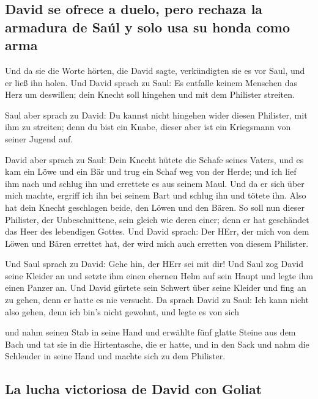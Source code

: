 \hypertarget{david-se-ofrece-a-duelo-pero-rechaza-la-armadura-de-sauxfal-y-solo-usa-su-honda-como-arma}{%
\subsection{David se ofrece a duelo, pero rechaza la armadura de Saúl y
solo usa su honda como
arma}\label{david-se-ofrece-a-duelo-pero-rechaza-la-armadura-de-sauxfal-y-solo-usa-su-honda-como-arma}}

 Und da sie die Worte hörten, die David sagte,
verkündigten sie es vor Saul, und er ließ ihn holen.  Und
David sprach zu Saul: Es entfalle keinem Menschen das Herz um deswillen;
dein Knecht soll hingehen und mit dem Philister streiten.

 Saul aber sprach zu David: Du kannst nicht hingehen
wider diesen Philister, mit ihm zu streiten; denn du bist ein Knabe,
dieser aber ist ein Kriegsmann von seiner Jugend auf.

 David aber sprach zu Saul: Dein Knecht hütete die Schafe
seines Vaters, und es kam ein Löwe und ein Bär und trug ein Schaf weg
von der Herde;  und ich lief ihm nach und schlug ihn und
errettete es aus seinem Maul. Und da er sich über mich machte, ergriff
ich ihn bei seinem Bart und schlug ihn und tötete ihn. 
Also hat dein Knecht geschlagen beide, den Löwen und den Bären. So soll
nun dieser Philister, der Unbeschnittene, sein gleich wie deren einer;
denn er hat geschändet das Heer des lebendigen Gottes. 
Und David sprach: Der HErr, der mich von dem Löwen und Bären errettet
hat, der wird mich auch erretten von diesem Philister.

 Und Saul sprach zu David: Gehe hin, der HErr sei mit
dir! Und Saul zog David seine Kleider an und setzte ihm einen ehernen
Helm auf sein Haupt und legte ihm einen Panzer an.  Und
David gürtete sein Schwert über seine Kleider und fing an zu gehen, denn
er hatte es nie versucht. Da sprach David zu Saul: Ich kann nicht also
gehen, denn ich bin's nicht gewohnt, und legte es von sich

 und nahm seinen Stab in seine Hand und erwählte fünf
glatte Steine aus dem Bach und tat sie in die Hirtentasche, die er
hatte, und in den Sack und nahm die Schleuder in seine Hand und machte
sich zu dem Philister.

\hypertarget{la-lucha-victoriosa-de-david-con-goliat}{%
\subsection{La lucha victoriosa de David con
Goliat}\label{la-lucha-victoriosa-de-david-con-goliat}}

